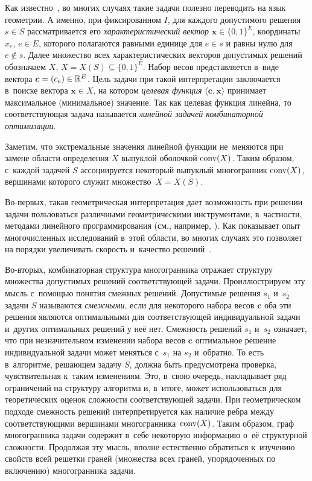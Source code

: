 Как известно~\cite{SchrijverCO:2003}, во многих случаях такие задачи полезно переводить на язык геометрии.
А именно, при фиксированном $I$, для каждого допустимого решения $s \in S$ рассматривается его \emph{характеристический вектор}
$\bm{x} \in \{0,1\}^E$, координаты $x_e$, $e \in E$, которого полагаются равными единице для $e \in s$
и равны нулю для $e \not\in s$. 
Далее множество всех характеристических векторов допустимых решений обозначаем $X$, $X = X(S) \subseteq \{0,1\}^E$.
Набор весов представляется в~виде вектора $\bm{c} = (c_e) \in \mathbb{R}^E$.
Цель задачи при такой интерпретации заключается в~поиске вектора $\bm{x} \in X$, на котором \emph{целевая функция} $\langle\bm{c}, \bm{x}\rangle$ принимает максимальное (минимальное) значение.
Так как целевая функция линейна, 
то соответствующая задача называется \emph{линейной задачей комбинаторной оптимизации}.

Заметим, что экстремальные значения линейной функции не~меняются при замене области определения $X$ выпуклой оболочкой $\operatorname{conv}(X)$.
Таким образом, с~каждой задачей $S$ ассоциируется некоторый выпуклый многогранник $\operatorname{conv}(X)$, вершинами которого служит множество~$X = X(S)$.

Во-первых, такая геометрическая интерпретация дает возможность при решении задачи пользоваться различными геометрическими инструментами, в~частности, методами линейного программирования (см., например, \cite{Shevchenko:2004}).
Как показывает опыт многочисленных исследований в~этой области, во многих случаях это позволяет на порядки увеличивать скорость и~качество решений~\cite{SchrijverCO:2003,Applegate:2003}.

Во-вторых, комбинаторная структура многогранника отражает 
структуру множества допустимых решений соответствующей задачи.
Проиллюстрируем эту мысль с~помощью понятия смежных решений.
Допустимые решения $s_1$ и~$s_2$ задачи $S$ называются \emph{смежными},
если для некоторого набора весов $\bm{c}$ оба эти решения являются оптимальными
для соответствующей индивидуальной задачи и~других оптимальных решений у неё нет.
Смежность решений $s_1$ и~$s_2$ означает, что при незначительном изменении набора весов $\bm{c}$ оптимальное решение индивидуальной задачи может меняться с~$s_1$ на $s_2$ и~обратно.
То есть в~алгоритме, решающем задачу $S$, должна быть предусмотрена проверка,
чувствительная к~таким изменениям.
Это, в~свою очередь, накладывает ряд ограничений на структуру алгоритма %
и, в~итоге, может использоваться для теоретических оценок сложности соответствующей задачи.
При геометрическом подходе смежность решений интерпретируется как наличие ребра
между соответствующими вершинами многогранника~$\operatorname{conv}(X)$.
Таким образом, граф многогранника задачи содержит в~себе некоторую информацию о~её структурной сложности. 
Продолжая эту мысль, вполне естественно обратиться к~изучению свойств всей решетки граней (множества всех граней, упорядоченных по включению) многогранника задачи.


